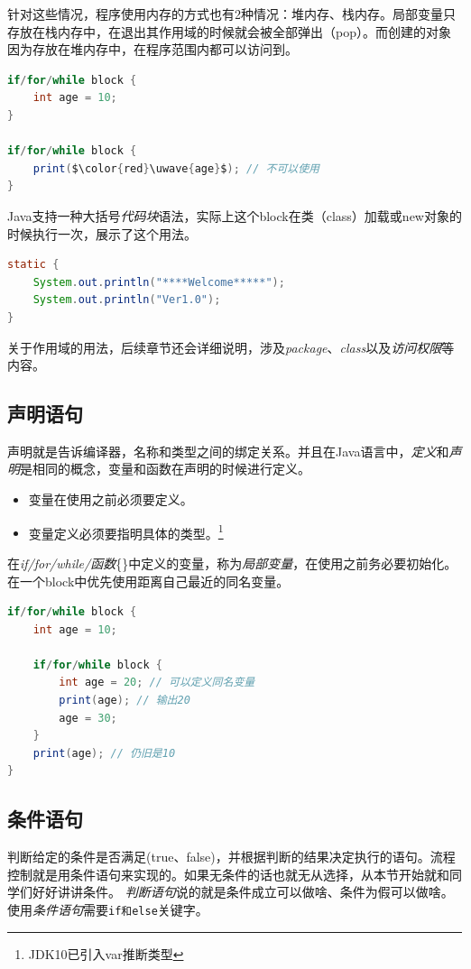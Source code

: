 针对这些情况，程序使用内存的方式也有2种情况：堆内存、栈内存。局部变量只存放在栈内存中，在退出其作用域的时候就会被全部弹出（pop）。而创建的对象因为存放在堆内存中，在程序范围内都可以访问到。

\begin{lstlisting}[language=Java, caption={变量有效范围},mathescape]
if/for/while block {
    int age = 10;
}

if/for/while block {
    print($\color{red}\uwave{age}$); // 不可以使用
}
\end{lstlisting}

Java支持一种大括号\emph{代码块}语法，实际上这个block在类（class）加载或new对象的时候执行一次，展示了这个用法。
\begin{lstlisting}[language=Java, caption={静态代码块},label=code:part1_java_sblock]
static {
    System.out.println("****Welcome*****");
    System.out.println("Ver1.0");
}
\end{lstlisting}

\noindent
关于作用域的用法，后续章节还会详细说明，涉及\emph{package}、\emph{class}以及\emph{访问权限}等内容。

\subsection{声明语句}
声明就是告诉编译器，名称和类型之间的绑定关系。并且在Java语言中，\emph{定义}和\emph{声明}是相同的概念，变量和函数在声明的时候进行定义。
\begin{itemize}
\item[1.] 变量在使用之前必须要定义。
\item[2.] 变量定义必须要指明具体的类型。\footnote{JDK10已引入var推断类型}
\end{itemize}

\noindent
在\emph{if/for/while/函数}\{\}中定义的变量，称为\emph{局部变量}，在使用之前务必要初始化。在一个block中优先使用距离自己最近的同名变量。
\begin{lstlisting}[language=Java, caption={同名变量规则}]
if/for/while block {
    int age = 10;

    if/for/while block {
        int age = 20; // 可以定义同名变量
        print(age); // 输出20
        age = 30;
    }
    print(age); // 仍旧是10
}
\end{lstlisting}

\subsection{条件语句}
判断给定的条件是否满足(true、false)，并根据判断的结果决定执行的语句。流程控制就是用条件语句来实现的。如果无条件的话也就无从选择，从本节开始就和同学们好好讲讲条件。
\emph{判断语句}说的就是条件成立可以做啥、条件为假可以做啥。使用\emph{条件语句}需要\lstinline{if和else}关键字。

